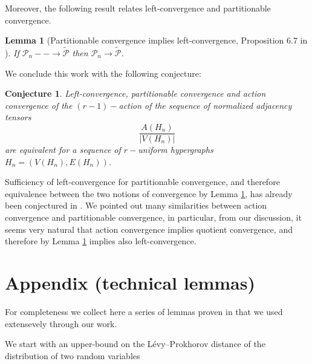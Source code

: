 \documentclass[11pt]{article}
\newtheorem{lemma}[theorem]{Lemma}
\newtheorem{conjecture}[theorem]{Conjecture}
\begin{document}
Moreover, the following result relates left-convergence and partitionable convergence.

\begin{lemma}[Partitionable convergence implies left-convergence, Proposition 6.7 in \cite{HypergraphonsZhao}]\label{PropImplPartLeftConv} If $\mathscr{P}_n--\rightarrow \tilde{\mathscr{P}}$ then $\mathscr{P}_n \rightarrow \tilde{\mathscr{P}}$. 
 \end{lemma}

 We conclude this work with the following conjecture:
 
\begin{conjecture}
Left-convergence, partitionable convergence and action convergence of the $(r-1)-$action of the sequence of normalized adjacency tensors
\begin{equation*}
    \frac{A(H_n)}{|V(H_n)|}
\end{equation*}
are equivalent for a sequence of $r-$uniform hypergraphs $H_n=(V(H_n),E(H_n))$.
\end{conjecture}

Sufficiency of left-convergence for partitionable convergence, and therefore equivalence between the two notions of convergence by Lemma \ref{PropImplPartLeftConv}, has already been conjectured in \cite{HypergraphonsZhao}. We pointed out many similarities between action convergence and partitionable convergence, in particular, from our discussion, it seems very natural that action convergence implies quotient convergence, and therefore by Lemma \ref{PropImplPartLeftConv} implies also left-convergence. 


\section*{Appendix (technical lemmas)}\label{SecAppendixTech}

For completeness we collect here a series of lemmas proven in  \cite{backhausz2018action} that we used extensevely through our work.

We start with an upper-bound on the Lévy–Prokhorov distance of the distribution of two random variables
\end{document}
